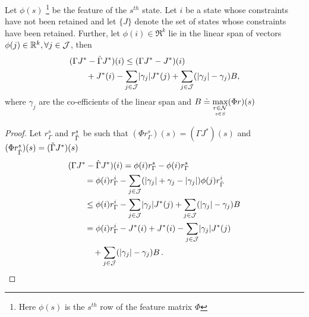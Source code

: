 \begin{theorem}
Let $\phi(s)$%
\footnote{Here $\phi(s)$ is the $s^{th}$ row of the feature matrix $\Phi$} be the feature of the $s^{th}$ state. Let $i$ be a state whose constraints have not been retained and let $\{J\}$ denote the set of states whose constraints have been retained. Further, let $\phi(i)\in \Re^k$ lie in the linear span of vectors $\phi(j)\in \mathbb{R}^k,\forall j\in \mathcal{J}$, then
\begin{align*}
\MoveEqLeft (\Gamma J^*-\hg J^*)(i)
 \leq 
(\Gamma J^*-J^*)(i) \\
& {}+J^*(i)-\underset{j\in \J}{\sum} |\gamma_j| J^*(j)
+ \underset{j\in \J}{\sum}(|\gamma_j|-\gamma_j) B,
\end{align*}
where $\gamma_j$ are the co-efficients of the linear span and $B\doteq \underset{\underset{s\in S}{r\in \mathcal{N}}}{\max}(\Phi r) (s)$
\end{theorem}
\begin{proof}
Let $r^s_{\Gamma}$ and $r^s_{\hat{\Gamma}}$ be such that $(\Phi r^s_{\Gamma})(s)=(\Gamma J^*)(s)$ and $(\Phi r^s_{\hat{\Gamma}})(s)=(\hat{\Gamma} J^*)(s)$
\begin{align*}
\MoveEqLeft (\Gamma J^*-\hg J^*)(i) 
=\phi(i) r^s_{\Gamma}- \phi(i) r^s_{\Gamma}\\
&=\phi(i) r^i_{\Gamma}- \underset{j\in \J}{\sum} (|\gamma_j|+\gamma_j -|\gamma_j|)\phi(j) r^i_{\hg}\\
&\leq \phi(i) r^i_{\Gamma}- \underset{j\in \J}{\sum} |\gamma_j| J^*(j) + \underset{j\in \J} {\sum} (|\gamma_j|-\gamma_j)B\\
&= \phi(i) r^i_{\Gamma}- J^*(i)+ J^*(i) -\underset{j\in \J}{\sum} |\gamma_j| J^*(j) \\
& \quad + \underset{j\in \J}{\sum} (|\gamma_j|-\gamma_j)B\,.
\end{align*}
\end{proof}
